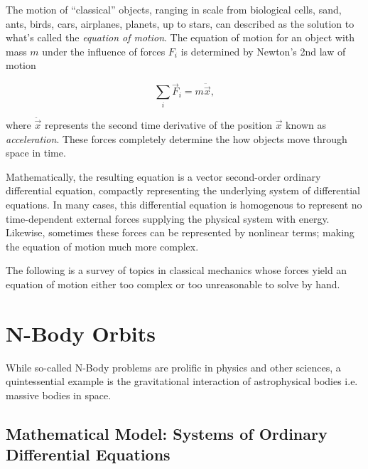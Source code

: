 \documentclass{report}
\begin{document}
    The motion of ``classical'' objects, ranging in scale from biological cells, sand, ants, birds, cars, airplanes, planets, up to stars, can described as the solution to what's called the \emph{equation of motion}.  The equation of motion for an object with mass $m$ under the influence of forces $F_i$ is determined by Newton's 2nd law of motion
    
    \begin{equation} \label{eq:newton}
        \sum_i \vec{F}_i = m \ddot{\vec{x}},
    \end{equation}

    where $\ddot{\vec{x}}$ represents the second time derivative of the position $\vec{x}$ known as \emph{acceleration}.  These forces completely determine the how objects move through space in time.
    
    Mathematically, the resulting equation is a vector second-order ordinary differential equation, compactly representing the underlying system of differential equations.  In many cases, this differential equation is homogenous to represent no time-dependent external forces supplying the physical system with energy.  Likewise, sometimes these forces can be represented by nonlinear terms; making the equation of motion much more complex.
    
    The following is a survey of topics in classical mechanics whose forces yield an equation of motion either too complex or too unreasonable to solve by hand.

\pagebreak

    \section{N-Body Orbits} \label{subsec:orbits}

        While so-called N-Body problems are prolific in physics and other sciences, a quintessential example is the gravitational interaction of astrophysical bodies i.e. massive bodies in space.

        \subsection{Mathematical Model: Systems of Ordinary Differential Equations}
\end{document}
